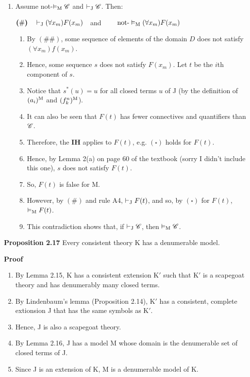 \begin{enumerate} [label = \textit{Case 4\alph*.}, leftmargin=3\parindent]
\begin{enumerate} [label = \roman*.]
        \item Assume not-$\vDash_\text{M} \mathscr{C}$ and $\vdash_\text{J} \mathscr{C}$. Then:
        \begin{center}
            $\bm{(\#)} \quad \vdash_\text{J} (\forall x_m) F(x_m)\quad $and $\quad \quad \text{not-}\vDash_\text{M}(\forall x_m)F(x_m)$
        \end{center}
        \begin{enumerate} [label = \alph*.]
            \item By $\bm{(\#\#)}$, some sequence of elements of the domain $D$ does not satisfy $(\forall x_m)f(x_m)$.
            \item Hence, some sequence $s$ does not satisfy $F(x_m)$. Let $t$ be the $i$th component of $s$.
            \item Notice that $s^*(u)=u$ for all closed terms $u$ of J (by the definition of $(a_i)^{\text{M}}$ and $(f_k^n)^{\text{M}}$).
            \item It can also be seen that $F(t)$ has fewer connectives and quantifiers than $\mathscr{C}$.
            \item Therefore, the \textbf{IH} applies to $F(t)$, e.g. $\bm{(\square)}$ holds for $F(t)$.
            \item Hence, by Lemma 2(a) on page 60 of the textbook (sorry I didn't include this one), $s$ does not satisfy $F(t)$.
            \item So, $F(t)$ is false for M.
            \item However, by $\bm{(\#)}$ and rule A4, $\vdash_\text{J} F(t)$, and so, by $\bm{(\square)}$ for $F(t)$, $\vDash_\text{M} F(t)$.
            \item This contradiction shows that, if $\vdash_\text{J} \mathscr{C}$, then $\vDash_\text{M} \mathscr{C}$.
        \end{enumerate}
    \end{enumerate}
\end{enumerate} 

\textbf{Proposition 2.17}
Every consistent theory K has a denumerable model. 

\textbf{Proof}
\begin{enumerate}
    \item By Lemma 2.15, K has a consistent extension K$'$ such that K$'$ is a scapegoat theory and has denumerably many closed terms.
    \item By Lindenbaum's lemma (Proposition 2.14), K$'$ has a consistent, complete extionsion J that has the same symbols as K$'$.
    \item Hence, J is also a scapegoat theory.
    \item By Lemma 2.16, J has a model M whose domain is the denumerable set of closed terms of J.
    \item Since J is an extension of K, M is a denumerable model of K.
\end{enumerate}

